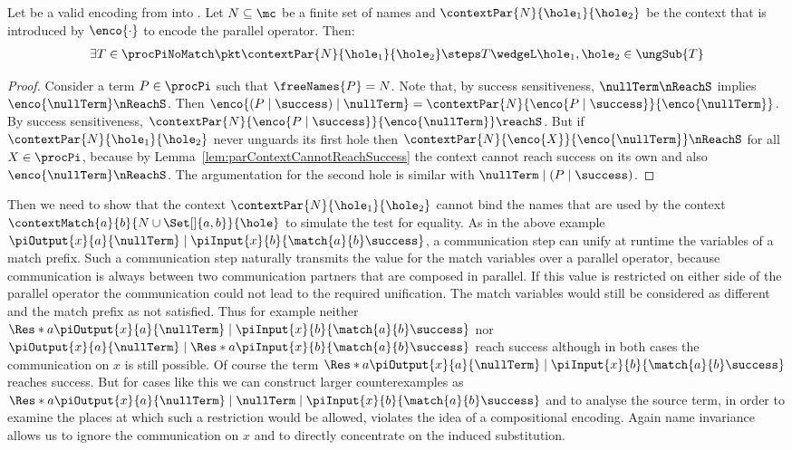 \documentclass[]{article}
\begin{document}
\begin{lemma}
	\label{lem:parContextUnguard}
	Let \encod be a valid encoding from \piT into \piNM.
	Let $ N \subseteq \mc $ be a finite set of names
	and $ \contextPar{N}{\hole_1}{\hole_2} $ be the context that is introduced by $ \enco{\cdot} $ to encode the parallel operator.
	Then:
	\begin{align*}
		\exists T \in \procPiNoMatch \pkt \contextPar{N}{\hole_1}{\hole_2} \steps T \wedgeL \hole_1, \hole_2 \in \ungSub{T}
	\end{align*}
\end{lemma}

\begin{proof}
	Consider a term $ P \in \procPi $ such that $ \freeNames{P} = N $.
	Note that, by success sensitiveness, $ \nullTerm \nReachS $ implies $ \enco{\nullTerm} \nReachS $.
	Then $ \enco{\left( P \mid \success \right) \mid \nullTerm} = \contextPar{N}{\enco{P \mid \success}}{\enco{\nullTerm}} $.
	By success sensitiveness, $ \contextPar{N}{\enco{P \mid \success}}{\enco{\nullTerm}} \reachS $.
	But if $ \contextPar{N}{\hole_1}{\hole_2} $ never unguards its first hole then $ \contextPar{N}{\enco{X}}{\enco{\nullTerm}} \nReachS $ for all $ X \in \procPi $, because by Lemma~\ref{lem:parContextCannotReachSuccess} the context cannot reach success on its own and also $ \enco{\nullTerm} \nReachS $. The argumentation for the second hole is similar with $ \nullTerm \mid \left( P \mid \success \right) $.
\end{proof}

Then we need to show that the context $ \contextPar{N}{\hole_1}{\hole_2} $ cannot bind the names that are used by the context $ \contextMatch{a}{b}{N \cup \Set[]{ a, b }}{\hole} $ to simulate the test for equality. As in the above example $ \piOutput{x}{a}{\nullTerm} \mid \piInput{x}{b}{\match{a}{b}\success} $, a communication step can unify at runtime the variables of a match prefix. Such a communication step naturally transmits the value for the match variables over a parallel operator, because communication is always between two communication partners that are composed in parallel. If this value is restricted on either side of the parallel operator the communication could not lead to the required unification. The match variables would still be considered as different and the match prefix as not satisfied. Thus for example neither $ \Res*{a}{\piOutput{x}{a}{\nullTerm}} \mid \piInput{x}{b}{\match{a}{b}\success} $ nor $ \piOutput{x}{a}{\nullTerm} \mid \Res*{a}{\piInput{x}{b}{\match{a}{b}\success}} $ reach success although in both cases the communication on $ x $ is still possible. Of course the term $ \Res*{a}{\piOutput{x}{a}{\nullTerm} \mid \piInput{x}{b}{\match{a}{b}\success}} $ reaches success. But for cases like this we can construct larger counterexamples as $ \Res*{a}{\piOutput{x}{a}{\nullTerm} \mid \nullTerm} \mid \piInput{x}{b}{\match{a}{b}\success} $ and to analyse the source term, in order to examine the places at which such a restriction would be allowed, violates the idea of a compositional encoding. Again name invariance allows us to ignore the communication on $ x $ and to directly concentrate on the induced substitution.
\end{document}
